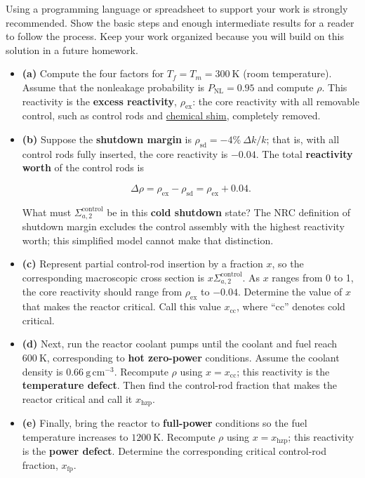 Using a programming language or spreadsheet to support your work is strongly recommended. Show the basic steps and enough intermediate results for a reader to follow the process. Keep your work organized because you will build on this solution in a future homework.

\begin{itemize}
\item
  \textbf{(a)} Compute the four factors for \(T_f=T_m=300~\mathrm{K}\) (room temperature). Assume that the nonleakage probability is \(P_{\mathrm{NL}}=0.95\) and compute \(\rho\). This reactivity is the \textbf{excess reactivity}, \(\rho_{\mathrm{ex}}\): the core reactivity with all removable control, such as control rods and \href{https://www.nuclear-power.com/glossary/boron-10/boric-acid-chemical-shim/}{chemical shim}, completely removed.
\item
  \textbf{(b)} Suppose the \textbf{shutdown margin} is \(\rho_{\mathrm{sd}}=-4\%~\Delta k/k\); that is, with all control rods fully inserted, the core reactivity is \(-0.04\). The total \textbf{reactivity worth} of the control rods is

  \[
  \Delta\rho=\rho_{\mathrm{ex}}-\rho_{\mathrm{sd}}
  =\rho_{\mathrm{ex}}+0.04.
  \]

  What must \(\Sigma^{\mathrm{control}}_{a,2}\) be in this \textbf{cold shutdown} state? The NRC definition of shutdown margin excludes the control assembly with the highest reactivity worth; this simplified model cannot make that distinction.
\item
  \textbf{(c)} Represent partial control-rod insertion by a fraction \(x\), so the corresponding macroscopic cross section is \(x\Sigma^{\mathrm{control}}_{a,2}\). As \(x\) ranges from 0 to 1, the core reactivity should range from \(\rho_{\mathrm{ex}}\) to \(-0.04\). Determine the value of \(x\) that makes the reactor critical. Call this value \(x_{\mathrm{cc}}\), where ``cc'' denotes cold critical.
\item
  \textbf{(d)} Next, run the reactor coolant pumps until the coolant and fuel reach \(600~\mathrm{K}\), corresponding to \textbf{hot zero-power} conditions. Assume the coolant density is \(0.66~\mathrm{g\,cm^{-3}}\). Recompute \(\rho\) using \(x=x_{\mathrm{cc}}\); this reactivity is the \textbf{temperature defect}. Then find the control-rod fraction that makes the reactor critical and call it \(x_{\mathrm{hzp}}\).
\item
  \textbf{(e)} Finally, bring the reactor to \textbf{full-power} conditions so the fuel temperature increases to \(1200~\mathrm{K}\). Recompute \(\rho\) using \(x=x_{\mathrm{hzp}}\); this reactivity is the \textbf{power defect}. Determine the corresponding critical control-rod fraction, \(x_{\mathrm{fp}}\).
\end{itemize}

